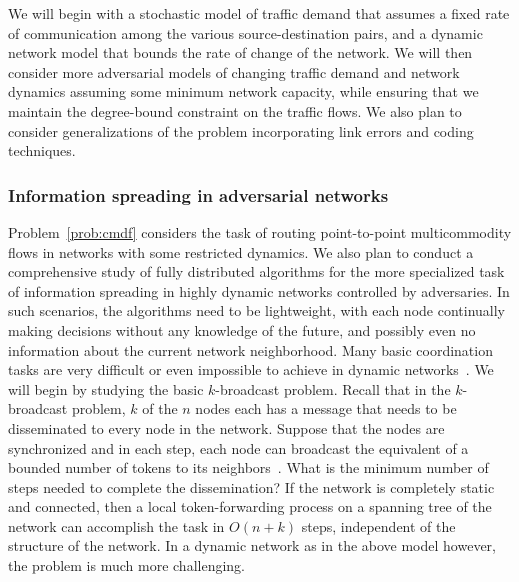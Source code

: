 
We will begin with a stochastic model of traffic demand that assumes a
fixed rate of communication among the various source-destination
pairs, and a dynamic network model that bounds the rate of change of
the network.  We will then consider more adversarial models of
changing traffic demand and network dynamics assuming some minimum
network capacity, while ensuring that we maintain the degree-bound
constraint on the traffic flows.  We also plan to consider
generalizations of the problem incorporating link errors and coding
techniques.



\subsubsection{Information spreading in adversarial networks}
\label{sec:spreading}
Problem~\ref{prob:cmdf} considers the task of routing point-to-point
multicommodity flows in networks with some restricted dynamics.  We
also plan to conduct a comprehensive study of fully distributed
algorithms for the more specialized task of information spreading in
highly dynamic networks controlled by adversaries.  In such scenarios,
the algorithms need to be lightweight, with each node continually
making decisions without any knowledge of the future, and possibly
even no information about the current network neighborhood.  Many
basic coordination tasks are very difficult or even impossible to
achieve in dynamic networks~\cite{fich+r:impossibility}.  We will
begin by studying the basic $k$-broadcast problem.  Recall that in the
$k$-broadcast problem, $k$ of the $n$ nodes each has a message that
needs to be disseminated to every node in the network.  Suppose that
the nodes are synchronized and in each step, each node can broadcast
the equivalent of a bounded number of tokens to its
neighbors~\cite{kuhn+lo:dynamic}.  What is the minimum number of steps
needed to complete the dissemination?  If the network is completely
static and connected, then a local token-forwarding process on a
spanning tree of the network can accomplish the task in $O(n + k)$
steps, independent of the structure of the network.  In a dynamic
network as in the above model however, the problem is much more
challenging.

